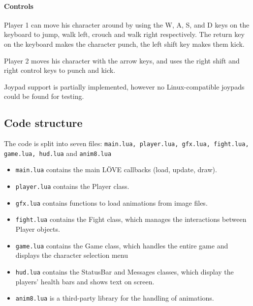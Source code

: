 \documentclass[11pt]{article}
\begin{document}
\paragraph{Controls}
Player 1 can move his character around by using the W, A, S, and D keys on the keyboard to jump, walk left, crouch and walk right respectively. The return key on the keyboard makes the character punch, the left shift key makes them kick.

Player 2 moves his character with the arrow keys, and uses the right shift and right control keys to punch and kick.

Joypad support is partially implemented, however no Linux-compatible joypads could be found for testing.

\subsection{Code structure}
The code is split into seven files: \texttt{main.lua, player.lua, gfx.lua, fight.lua, game.lua, hud.lua} and \texttt{anim8.lua}
\begin{itemize}[noitemsep]
    \item \texttt{main.lua} contains the main L\"{O}VE callbacks (load, update, draw).
    \item \texttt{player.lua} contains the Player class.
    \item \texttt{gfx.lua} contains functions to load animations from image files.
    \item \texttt{fight.lua} contains the Fight class, which manages the interactions between Player objects.
    \item \texttt{game.lua} contains the Game class, which handles the entire game and displays the character selection menu
    \item \texttt{hud.lua} contains the StatusBar and Messages classes, which display the players' health bars and shows text on screen.
    \item \texttt{anim8.lua} is a third-party library for the handling of animations.
\end{itemize}
\end{document}
